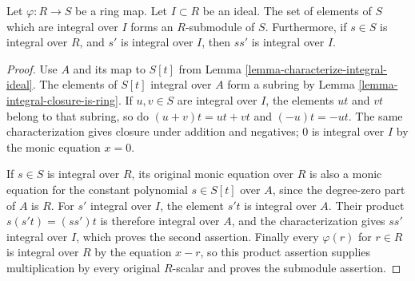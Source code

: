 \begin{lemma}
\label{lemma-integral-over-ideal-is-submodule}
Let $\varphi : R \to S$ be a ring map.
Let $I \subset R$ be an ideal.
The set of elements of $S$ which are integral
over $I$ forms an $R$-submodule of $S$.
Furthermore, if $s \in S$ is integral over
$R$, and $s'$ is integral over $I$, then
$ss'$ is integral over $I$.
\end{lemma}

\begin{proof}
Use $A$ and its map to $S[t]$ from
Lemma \ref{lemma-characterize-integral-ideal}. The elements of
$S[t]$ integral over $A$ form a subring by
Lemma \ref{lemma-integral-closure-is-ring}. If $u,v\in S$
are integral over $I$, the elements $ut$ and $vt$ belong to
that subring, so do $(u+v)t=ut+vt$ and $(-u)t=-ut$.
The same characterization gives closure under addition and negatives;
$0$ is integral over $I$ by the monic equation $x=0$.

If $s\in S$ is integral over $R$, its original monic equation
over $R$ is also a monic equation for the constant polynomial
$s\in S[t]$ over $A$, since the degree-zero part of $A$ is
$R$. For $s'$ integral over $I$, the element $s't$ is integral
over $A$. Their product $s(s't)=(ss')t$ is therefore integral
over $A$, and the characterization gives $ss'$ integral over
$I$, which proves the second assertion. Finally every
$\varphi(r)$ for $r\in R$ is integral over $R$ by the equation
$x-r$, so this product assertion supplies multiplication by
every original $R$-scalar and proves the submodule assertion.
\end{proof}